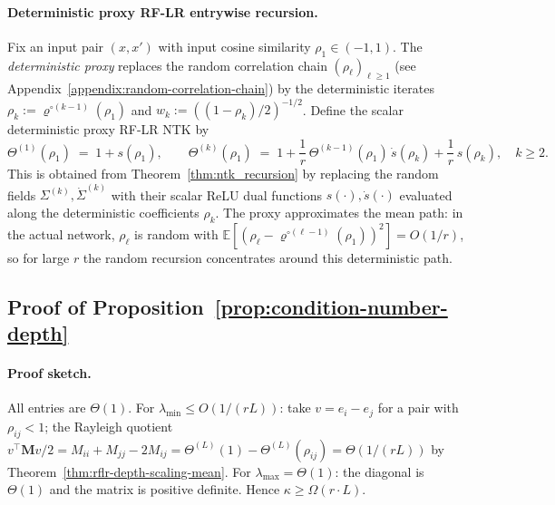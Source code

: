 \paragraph{Deterministic proxy RF-LR entrywise recursion.}\label{def:deterministic-proxy}
Fix an input pair \((x,x')\) with input cosine similarity \(\rho_1\in(-1,1)\). The \emph{deterministic proxy} replaces the random correlation chain \((\rho_\ell)_{\ell\ge 1}\) (see Appendix~\ref{appendix:random-correlation-chain}) by the deterministic iterates \(\rho_k := \varrho^{\circ(k-1)}(\rho_1)\) and \(w_k := ((1-\rho_k)/2)^{-1/2}\). Define the scalar deterministic proxy RF-LR NTK by
\begin{equation}\label{eq:rflr-scalar-mean-ntk-rec}
\Theta^{(1)}(\rho_1) \;=\; 1 + s(\rho_1),
\qquad
\Theta^{(k)}(\rho_1) \;=\; 1 + \frac{1}{r}\,\Theta^{(k-1)}(\rho_1)\,\dot{s}(\rho_k) + \frac{1}{r}\,s(\rho_k),\quad k\ge 2.
\end{equation}
This is obtained from Theorem~\ref{thm:ntk_recursion} by replacing the random fields \(\Sigma^{(k)},\dot{\Sigma}^{(k)}\) with their scalar ReLU dual functions \(s(\cdot),\dot{s}(\cdot)\) evaluated along the deterministic coefficients \(\rho_k\). The proxy approximates the mean path: in the actual network, \(\rho_\ell\) is random with \(\mathbb{E}[(\rho_\ell - \varrho^{\circ(\ell-1)}(\rho_1))^2] = O(1/r)\), so for large \(r\) the random recursion concentrates around this deterministic path.

\subsection{Proof of Proposition~\ref{prop:condition-number-depth}}\label{appendix:proof-condition-number}

\paragraph{Proof sketch.}
All entries are \(\Theta(1)\). For \(\lambda_{\min}\le O(1/(rL))\): take \(v=e_i-e_j\) for a pair with \(\rho_{ij}<1\); the Rayleigh quotient \(v^\top\mathbf{M}v/2=M_{ii}+M_{jj}-2M_{ij}=\Theta^{(L)}(1)-\Theta^{(L)}(\rho_{ij})=\Theta(1/(rL))\) by Theorem~\ref{thm:rflr-depth-scaling-mean}. For \(\lambda_{\max}=\Theta(1)\): the diagonal is \(\Theta(1)\) and the matrix is positive definite. Hence \(\kappa\ge\Omega(r\cdot L)\).

